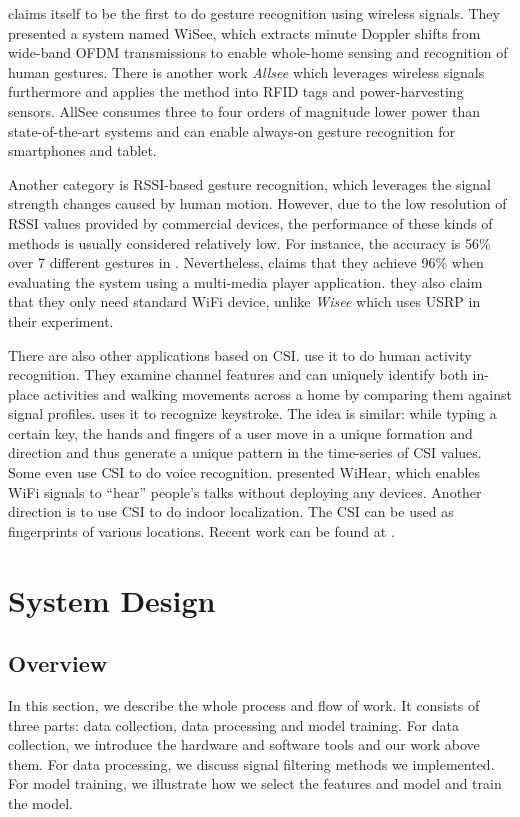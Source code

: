 \documentclass[conference]{IEEEtran}
\begin{document}
\cite{pu2013whole} claims itself to be the first to do gesture recognition using wireless signals. 
They presented a system named WiSee, which extracts minute Doppler shifts from wide-band OFDM transmissions to enable whole-home sensing and recognition of human gestures.
There is another work \emph{Allsee} \cite{kellogg2014bringing} which leverages wireless signals furthermore and applies the method into RFID tags and power-harvesting sensors.  AllSee consumes three to four orders of magnitude lower power than state-of-the-art systems and can enable always-on gesture recognition for smartphones and tablet.

Another category is RSSI-based gesture recognition, which leverages the signal strength changes caused by human motion.
However, due to the low resolution of RSSI values provided by commercial devices, the performance of these kinds of methods is usually considered relatively low.
For instance, the accuracy is 56\% over 7 different gestures in \cite{sigg2014telepathic}.
Nevertheless, \cite{abdelnasser2015wigest} claims that they achieve 96\% when evaluating the system using a multi-media player application.
they also claim that they only need standard WiFi device, unlike \emph{Wisee} which uses USRP in their experiment.

There are also other applications based on CSI. \cite{wang2015understanding} \cite{wang2014eyes} \cite{wang2015robust} use it to do human activity recognition. They examine channel features and can uniquely identify both in-place activities and walking movements across a home by comparing them
against signal profiles.
\cite{ali2015keystroke} uses it to recognize keystroke. The idea is similar: while typing a certain key, the hands and fingers of a user move in a unique formation and direction and thus generate a unique pattern in the time-series of CSI values.
Some even use CSI to do voice recognition. \cite{wang2014we} presented WiHear, which enables WiFi signals to ``hear'' people's talks without deploying any devices.
Another direction is to use CSI to do indoor localization. The CSI can be used as fingerprints of various locations. Recent work can be found at \cite{hosen2015utilizing} \cite{kotaru2015spotfi} \cite{li2015passive} \cite{yang2015enhancing} \cite{jiang2014communicating} \cite{chen2014fine}.

\section{System Design} \label{section-design}
\subsection{Overview}
In this section, we describe the whole process and flow of work. It consists of three parts: data collection, data processing and model training. For data collection, we introduce the hardware and software tools and our work above them. For data processing, we discuss signal filtering methods we implemented. For model training, we illustrate how we select the features and model and train the model.
\end{document}
